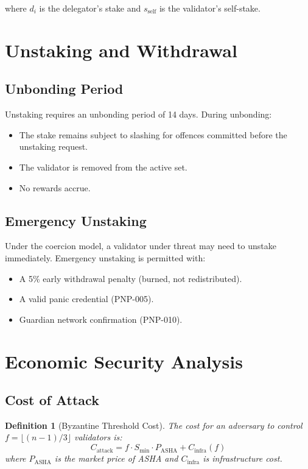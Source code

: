 \documentclass[11pt,a4paper]{article}
\newtheorem{definition}{Definition}[section]
\begin{document}
where $d_i$ is the delegator's stake and $s_{\mathrm{self}}$ is the
validator's self-stake.

\section{Unstaking and Withdrawal}
\label{sec:unstaking}

\subsection{Unbonding Period}

Unstaking requires an unbonding period of 14 days.  During unbonding:
\begin{itemize}
    \item The stake remains subject to slashing for offences committed
    before the unstaking request.
    \item The validator is removed from the active set.
    \item No rewards accrue.
\end{itemize}

\subsection{Emergency Unstaking}

Under the coercion model, a validator under threat may need to unstake
immediately.  Emergency unstaking is permitted with:
\begin{itemize}
    \item A 5\% early withdrawal penalty (burned, not redistributed).
    \item A valid panic credential (PNP-005).
    \item Guardian network confirmation (PNP-010).
\end{itemize}

\section{Economic Security Analysis}
\label{sec:security}

\subsection{Cost of Attack}

\begin{definition}[Byzantine Threshold Cost]
    The cost for an adversary to control $f = \lfloor (n-1)/3 \rfloor$
    validators is:
    \[
        C_{\mathrm{attack}} = f \cdot S_{\min} \cdot P_{\mathrm{ASHA}}
        + C_{\mathrm{infra}}(f)
    \]
    where $P_{\mathrm{ASHA}}$ is the market price of ASHA and
    $C_{\mathrm{infra}}$ is infrastructure cost.
\end{definition}
\end{document}

